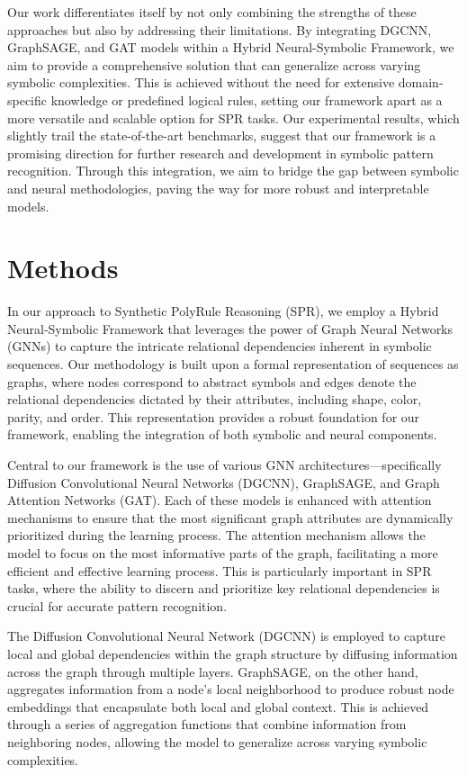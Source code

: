 \documentclass{article}
\begin{document}
Our work differentiates itself by not only combining the strengths of these approaches but also by addressing their limitations. By integrating DGCNN, GraphSAGE, and GAT models within a Hybrid Neural-Symbolic Framework, we aim to provide a comprehensive solution that can generalize across varying symbolic complexities. This is achieved without the need for extensive domain-specific knowledge or predefined logical rules, setting our framework apart as a more versatile and scalable option for SPR tasks. Our experimental results, which slightly trail the state-of-the-art benchmarks, suggest that our framework is a promising direction for further research and development in symbolic pattern recognition. Through this integration, we aim to bridge the gap between symbolic and neural methodologies, paving the way for more robust and interpretable models.

\section{Methods}
In our approach to Synthetic PolyRule Reasoning (SPR), we employ a Hybrid Neural-Symbolic Framework that leverages the power of Graph Neural Networks (GNNs) to capture the intricate relational dependencies inherent in symbolic sequences. Our methodology is built upon a formal representation of sequences as graphs, where nodes correspond to abstract symbols and edges denote the relational dependencies dictated by their attributes, including shape, color, parity, and order. This representation provides a robust foundation for our framework, enabling the integration of both symbolic and neural components.

Central to our framework is the use of various GNN architectures—specifically Diffusion Convolutional Neural Networks (DGCNN), GraphSAGE, and Graph Attention Networks (GAT). Each of these models is enhanced with attention mechanisms to ensure that the most significant graph attributes are dynamically prioritized during the learning process. The attention mechanism allows the model to focus on the most informative parts of the graph, facilitating a more efficient and effective learning process. This is particularly important in SPR tasks, where the ability to discern and prioritize key relational dependencies is crucial for accurate pattern recognition.

The Diffusion Convolutional Neural Network (DGCNN) is employed to capture local and global dependencies within the graph structure by diffusing information across the graph through multiple layers. GraphSAGE, on the other hand, aggregates information from a node's local neighborhood to produce robust node embeddings that encapsulate both local and global context. This is achieved through a series of aggregation functions that combine information from neighboring nodes, allowing the model to generalize across varying symbolic complexities.
\end{document}
